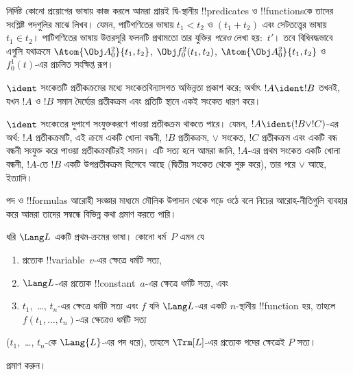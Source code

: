 \documentclass[../../../include/open-logic-section]{subfiles}
\begin{document}
নির্দিষ্ট কোনো প্রয়োগের ভাষায় কাজ করলে আমরা প্রায়ই দ্বি-স্থানীয়
!!{predicate}s ও !!{function}sকে তাদের সংশ্লিষ্ট পদগুলির মাঝে লিখব।
যেমন, পাটিগণিতের ভাষায় $t_1 < t_2$ ও $(t_1 + t_2)$ এবং সেটতত্ত্বের
ভাষায় $t_1 \in t_2$। পাটিগণিতের ভাষায় উত্তরসূরি ফলনটি প্রথামতো
তার যুক্তির \emph{পরেও} লেখা হয়:~$t'$। তবে বিধিবদ্ধভাবে এগুলি যথাক্রমে
$\Atom{\Obj A^2_0}{t_1, t_2}$, $\Obj f^2_0(t_1, t_2)$,
$\Atom{\Obj A^2_0}{t_1, t_2}$ ও $f^1_0(t)$-এর প্রচলিত সংক্ষিপ্ত রূপ।

\begin{defn}[সংকেতবিন্যাসগত অভিন্নতা]
$\ident$ সংকেতটি প্রতীকক্রমের মধ্যে সংকেতবিন্যাসগত অভিন্নতা প্রকাশ করে;
অর্থাৎ $!A \ident !B$ তখনই, যখন $!A$ ও $!B$ সমান দৈর্ঘ্যের প্রতীকক্রম
এবং প্রতিটি স্থানে একই সংকেত ধারণ করে।
\end{defn}

$\ident$ সংকেতের দুপাশে সংযুক্তকরণে পাওয়া প্রতীকক্রম থাকতে পারে। যেমন,
$!A \ident (!B \lor !C)$-এর অর্থ: $!A$ প্রতীকক্রমটি, এই ক্রমে একটি
খোলা বন্ধনী, $!B$ প্রতীকক্রম, $\lor$ সংকেত, $!C$ প্রতীকক্রম এবং একটি
বন্ধ বন্ধনী সংযুক্ত করে পাওয়া প্রতীকক্রমটিরই সমান। এটি সত্য হলে আমরা
জানি, $!A$-এর প্রথম সংকেত একটি খোলা বন্ধনী, $!A$-তে $!B$ একটি
উপপ্রতীকক্রম হিসেবে আছে (দ্বিতীয় সংকেত থেকে শুরু করে), তার পরে
$\lor$ আছে, ইত্যাদি।

পদ ও !!{formula}s আরোহী সংজ্ঞার মাধ্যমে মৌলিক উপাদান থেকে গড়ে ওঠে বলে
নিচের আরোহ-নীতিগুলি ব্যবহার করে আমরা তাদের সম্বন্ধে বিভিন্ন কথা প্রমাণ
করতে পারি।

\begin{lem}
    ধরি $\Lang L$ একটি প্রথম-ক্রমের ভাষা।
    কোনো ধর্ম~$P$ এমন যে
    \begin{enumerate}
        \item প্রত্যেক !!{variable}~$v$-এর ক্ষেত্রে ধর্মটি সত্য,
        \item $\Lang L$-এর প্রত্যেক !!{constant}~$a$-এর ক্ষেত্রে ধর্মটি
        সত্য, এবং
        \item $t_1$,~\dots, $t_n$-এর ক্ষেত্রে ধর্মটি সত্য এবং $f$ যদি
        $\Lang L$-এর একটি $n$-স্থানীয় !!{function} হয়, তাহলে
        $f(t_1,\dotsc,t_n)$-এর ক্ষেত্রেও ধর্মটি সত্য
    \end{enumerate}
    ($t_1$,~\dots, $t_n$-কে $\Lang{L}$-এর পদ ধরে),
    তাহলে $\Trm[L]$-এর প্রত্যেক পদের ক্ষেত্রেই $P$ সত্য।
\end{lem}

\begin{prob}
     প্রমাণ করুন।
\end{prob}
\end{document}
